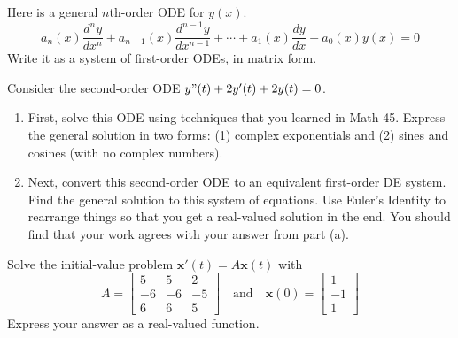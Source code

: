 \documentclass[12pt,letterpaper]{hmcpset}
\newcommand{\m}[1]{\begin{bmatrix} #1 \end{bmatrix}}
\begin{document}
\begin{problem}[2]
    Here is a general $n$th-order ODE for $y(x)$.
    \[
        a_n(x)\frac{d^ny}{dx^n}+a_{n-1}(x)\frac{d^{n-1}y}{dx^{n-1}}
        +\cdots+a_1(x)\frac{dy}{dx}+a_0(x)y(x)=0
    \]
    Write it as a system of first-order ODEs, in matrix form.
\end{problem}
\begin{solution}
    \vfill
\end{solution}
\newpage

\begin{problem}[3]
    Consider the second-order ODE $y"(t)+2y'(t)+2y(t)=0$.
    \begin{enumerate}
        \item First, solve this ODE using techniques that you learned
            in Math 45. Express the general solution in two forms: (1)
            complex exponentials and (2) sines and cosines (with no
            complex numbers).
        \item Next, convert this second-order ODE to an equivalent
            first-order DE system. Find the general solution to this
            system of equations. Use Euler's Identity to rearrange
            things so that you get a real-valued solution in the
            end. You should find that your work agrees with your answer
            from part (a).
    \end{enumerate}
\end{problem}
\begin{solution}
    \vfill
\end{solution}
\newpage

\begin{problem}[4]
    Solve the initial-value problem $\mathbf{x}'(t)=A\mathbf{x}(t)$
    with
    \[
        A=\m{5&5&2\\-6&-6&-5\\6&6&5}
        \quad\text{and}\quad
        \mathbf{x}(0)=\m{1\\-1\\1}
    \]
    Express your answer as a real-valued function.
\end{problem}
\begin{solution}
    \vfill
\end{solution}
\newpage
\end{document}
